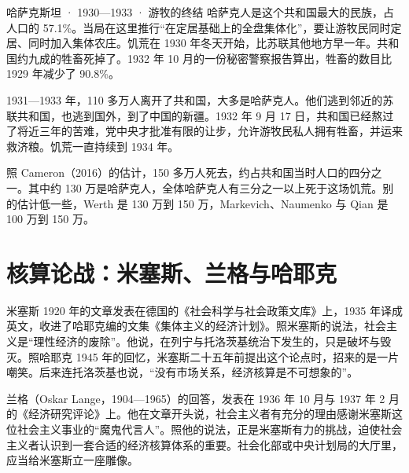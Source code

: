 \begin{case}{哈萨克斯坦 · 1930—1933 · 游牧的终结}
哈萨克人是这个共和国最大的民族，占人口的 57.1\%\cite{cameron2016}。当局在这里推行“在定居基础上的全盘集体化”，要让游牧民同时定居、同时加入集体农庄\cite{cameron2016}。饥荒在 1930 年冬天开始，比苏联其他地方早一年\cite{cameron2016}。共和国约九成的牲畜死掉了\cite{cameron2016}。1932 年 10 月的一份秘密警察报告算出，牲畜的数目比 1929 年减少了 90.8\%\cite{cameron2016}。

1931—1933 年，110 多万人离开了共和国，大多是哈萨克人\cite{cameron2016}。他们逃到邻近的苏联共和国，也逃到国外，到了中国的新疆\cite{cameron2016}。1932 年 9 月 17 日，共和国已经熬过了将近三年的苦难，党中央才批准有限的让步，允许游牧民私人拥有牲畜，并运来救济粮\cite{cameron2016}。饥荒一直持续到 1934 年\cite{cameron2016}。

照 Cameron（2016）的估计，150 多万人死去，约占共和国当时人口的四分之一\cite{cameron2016}。其中约 130 万是哈萨克人，全体哈萨克人有三分之一以上死于这场饥荒\cite{cameron2016}。别的估计低一些，Werth 是 130 万到 150 万，Markevich、Naumenko 与 Qian 是 100 万到 150 万\cite{werth2016,mnq2021}。
\end{case}

\section{核算论战：米塞斯、兰格与哈耶克}\label{sec:soviet-calculation}

米塞斯 1920 年的文章发表在德国的《社会科学与社会政策文库》上，1935 年译成英文，收进了哈耶克编的文集《集体主义的经济计划》\cite{mises1935}。照米塞斯的说法，社会主义是“理性经济的废除”\cite{mises1935}。他说，在列宁与托洛茨基统治下发生的，只是破坏与毁灭\cite{mises1935}。照哈耶克 1945 年的回忆，米塞斯二十五年前提出这个论点时，招来的是一片嘲笑\cite{hayek1945}。后来连托洛茨基也说，“没有市场关系，经济核算是不可想象的”\cite{hayek1945}。

兰格（Oskar Lange，1904—1965）的回答，发表在 1936 年 10 月与 1937 年 2 月的《经济研究评论》上\cite{lange1938,loc31}。他在文章开头说，社会主义者有充分的理由感谢米塞斯这位社会主义事业的“魔鬼代言人”\cite{lange1938}。照他的说法，正是米塞斯有力的挑战，迫使社会主义者认识到一套合适的经济核算体系的重要\cite{lange1938}。社会化部或中央计划局的大厅里，应当给米塞斯立一座雕像\cite{lange1938}。

